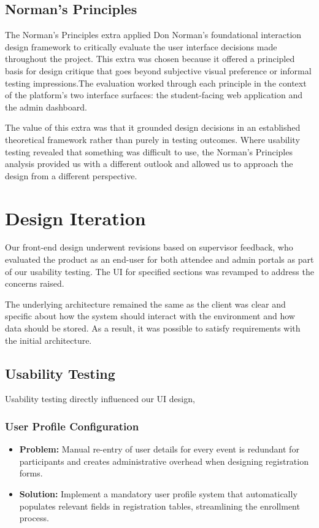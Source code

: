 \documentclass{article}
\begin{document}
\subsection*{Norman's Principles}

The Norman's Principles extra applied Don Norman's foundational interaction design framework to critically evaluate the user interface decisions made throughout the project. This extra was chosen because it offered a principled basis for design critique that goes beyond subjective visual preference or informal testing impressions.The evaluation worked through each principle in the context of the platform's two interface surfaces: the student-facing web application and the admin dashboard. 

The value of this extra was that it grounded design decisions in an established theoretical framework rather than purely in testing outcomes. Where usability testing revealed that something was difficult to use, the Norman's Principles analysis provided us with a different outlook and allowed us to approach the design from a different perspective.



\section{Design Iteration}

Our front-end design underwent revisions based on supervisor feedback, who
evaluated the product as an end-user for both attendee and admin portals as
part of our usability testing. The UI for specified sections was revamped to
address the concerns raised.

The underlying architecture remained the same as the client was clear and
specific about how the system should interact with the environment and how
data should be stored. As a result, it was possible to satisfy requirements
with the initial architecture.

\subsection{Usability Testing}

Usability testing directly influenced our UI design,

\subsubsection{User Profile Configuration}

\begin{itemize}
    \item \textbf{Problem:} Manual re-entry of user details for every event is
    redundant for participants and creates administrative overhead when
    designing registration forms.
    \item \textbf{Solution:} Implement a mandatory user profile system that
    automatically populates relevant fields in registration tables, streamlining
    the enrollment process.
\end{itemize}
\end{document}

